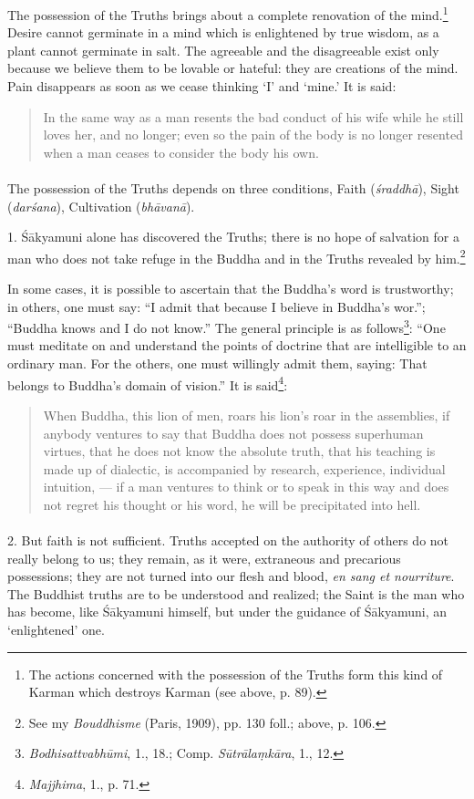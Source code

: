 \documentclass[a4paper, 11pt, oneside, english, landscape]{article}
\begin{document}
The possession of the Truths brings about a complete renovation of the mind.\footnote{The actions concerned with the possession of the Truths form this kind of Karman which destroys Karman (see above, p. 89).} Desire cannot germinate in a mind which is enlightened by true wisdom, as a plant cannot germinate in salt. The agreeable and the disagreeable exist only because we believe them to be lovable or hateful: they are creations of the mind. Pain disappears as soon as we cease thinking `I' and `mine.' It is said:
\begin{quotation}
\small
In the same way as a man resents the bad conduct of his wife while he still loves her, and no longer; even so the pain of the body is no longer resented when a man ceases to consider the body his own.
\end{quotation}
\paragraph{}
The possession of the Truths depends on three conditions, Faith (\emph{śraddhā}), Sight (\emph{darśana}), Cultivation (\emph{bhāvanā}).

1. Śākyamuni alone has discovered the Truths; there is no hope of salvation for a man who does not take refuge in the Buddha and in the Truths revealed by him.\footnote{See my \emph{Bouddhisme} (Paris, 1909), pp. 130 foll.; above, p. 106.}

In some cases, it is possible to ascertain that the Buddha's word is trustworthy; in others, one must say: ``I admit that because I believe in Buddha's wor.''; ``Buddha knows and I do not know.'' The general principle is as follows\footnote{\emph{Bodhisattvabhūmi}, 1., 18.; Comp. \emph{Sūtrālaṃkāra}, 1., 12.}: ``One must meditate on and understand the points of doctrine that are intelligible to an ordinary man. For the others, one must willingly admit them, saying: That belongs to Buddha's domain of vision.'' It is said\footnote{\emph{Majjhima}, 1., p. 71.}:
\begin{quotation}
\small
When Buddha, this lion of men, roars his lion's roar in the assemblies, if anybody ventures to say that Buddha does not possess superhuman virtues, that he does not know the absolute truth, that his teaching is made up of dialectic, is accompanied by research, experience, individual intuition, --- if a man ventures to think or to speak in this way and does not regret his thought or his word, he will be precipitated into hell.
\end{quotation}
\paragraph{}
2. But faith is not sufficient. Truths accepted on the authority of others do not really belong to us; they remain, as it were, extraneous and precarious possessions; they are not turned into our flesh and blood, \emph{en sang et nourriture}. The Buddhist truths are to be understood and realized; the Saint is the man who has become, like Śākyamuni himself, but under the guidance of Śākyamuni, an `enlightened' one.
\end{document}
